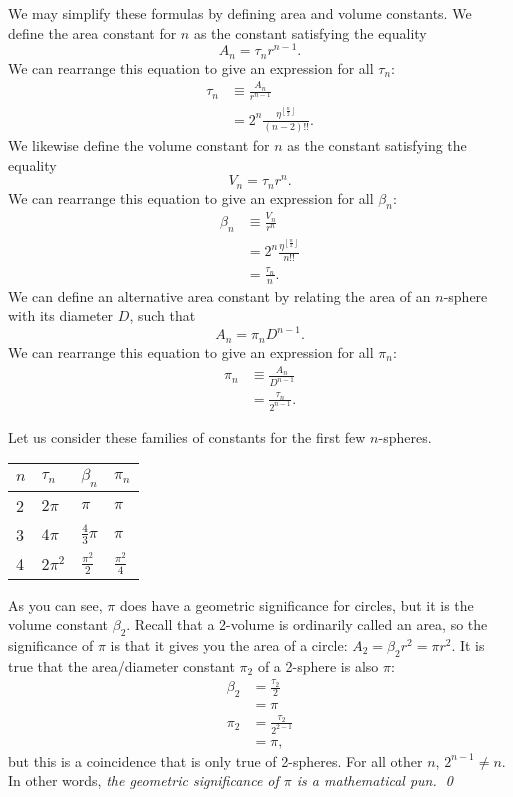 \documentclass{article}
\begin{document}
We may simplify these formulas by defining area and volume constants. We define
the area constant for $n$ as the constant satisfying the equality
\[
    A_n = \tau_n r^{n-1}.
\]
We can rearrange this equation to give an expression for all $\tau_n$:
\begin{align*}
    \tau_n & \equiv \frac{A_n}{r^{n-1}} \\
           & = 2^n \frac{\eta^{\left \lfloor \frac{n}{2} \right \rfloor}}{(n-2)!!}.
\end{align*}
We likewise define the volume constant for $n$ as the constant satisfying the
equality
\[
    V_n = \tau_n r^n.
\]
We can rearrange this equation to give an expression for all $\beta_n$:
\begin{align*}
    \beta_n & \equiv \frac{V_n}{r^n} \\
            &= 2^n \frac{\eta^{\left \lfloor \frac{n}{2} \right \rfloor}}{n!!} \\
            &= \frac{\tau_n}{n}.
\end{align*}
We can define an alternative area constant by relating the area of an $n$-sphere
with its diameter $D$, such that
\[
    A_n = \pi_n D^{n-1}.
\]
We can rearrange this equation to give an expression for all $\pi_n$:
\begin{align*}
    \pi_n & \equiv \frac{A_n}{D^{n-1}} \\
          & = \frac{\tau_n}{2^{n-1}}.
\end{align*}

Let us consider these families of constants for the first few $n$-spheres.

\renewcommand{\arraystretch}{1.5}
\begin{tabular}{l | l l l}
    $n$ & $\tau_n$           & $\beta_n$           & $\pi_n$             \\
    \hline
    2   & $2\pi$             & $\pi$               & $\pi$               \\
    3   & $4\pi$             & $\frac{4}{3}\pi$    & $\pi$               \\
    4   & $2\pi^2$           & $\frac{\pi^2}{2}$   & $\frac{\pi^2}{4}$   \\
\end{tabular}
\renewcommand{\arraystretch}{1}

As you can see, $\pi$ does have a geometric significance for circles, but it is
the volume constant $\beta_2$. Recall that a 2-volume is ordinarily called an
area, so the significance of $\pi$ is that it gives you the area of a circle:
$A_2 = \beta_2 r^2 = \pi r^2$. It is true that the area/diameter constant
$\pi_2$ of a 2-sphere is also $\pi$:
\begin{align*}
    \beta_2 &= \frac{\tau_2}{2} \\
            &= \pi \\
    \pi_2 &= \frac{\tau_2}{2^{2-1}} \\
          &= \pi,
\end{align*}
but this is a coincidence that is only true of 2-spheres. For all other $n$,
$2^{n-1} \ne n$. In other words, \em{the geometric significance of $\pi$ is a
mathematical pun}.
\qed
\end{document}
